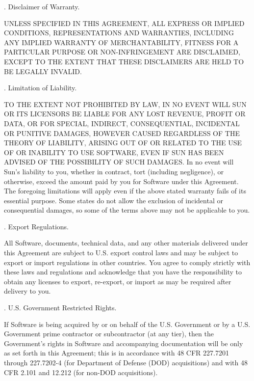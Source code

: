 \bigskip 
\par {}.      Disclaimer of Warranty. 
\bigskip 
\par \noindent UNLESS SPECIFIED IN THIS AGREEMENT, ALL EXPRESS OR IMPLIED CONDITIONS, REPRESENTATIONS AND WARRANTIES, INCLUDING ANY IMPLIED WARRANTY OF MERCHANTABILITY, FITNESS FOR A PARTICULAR PURPOSE OR NON-INFRINGEMENT ARE DISCLAIMED, EXCEPT TO THE EXTENT THAT THESE DISCLAIMERS ARE HELD TO BE LEGALLY INVALID. 
\bigskip 
\par {}.     Limitation of Liability. 
\bigskip 
\par \noindent TO THE EXTENT NOT PROHIBITED BY LAW, IN NO EVENT WILL SUN OR ITS LICENSORS BE LIABLE FOR ANY LOST REVENUE, PROFIT OR DATA, OR FOR SPECIAL, INDIRECT, CONSEQUENTIAL, INCIDENTAL OR PUNITIVE DAMAGES, HOWEVER CAUSED REGARDLESS OF THE THEORY OF LIABILITY, ARISING OUT OF OR RELATED TO THE USE OF OR INABILITY TO USE SOFTWARE, EVEN IF SUN HAS BEEN ADVISED OF THE POSSIBILITY OF SUCH DAMAGES. In no event will Sun's liability to you, whether in contract, tort (including negligence), or otherwise, exceed the amount paid by you for Software under this Agreement. The foregoing limitations will apply even if the above stated warranty fails of its essential purpose. Some states do not allow the exclusion of incidental or consequential damages, so some of the terms above may not be applicable to you. 
\bigskip 
\par {}.     Export Regulations. 
\bigskip 
\par \noindent All Software, documents, technical data, and any other materials delivered under this Agreement are subject to U.S. export control laws and may be subject to export or import regulations in other countries. You agree to comply strictly with these laws and regulations and acknowledge that you have the responsibility to obtain any licenses to export, re-export, or import as may be required after delivery to you. 
\bigskip 
\par {}.     U.S. Government Restricted Rights. 
\bigskip 
\par \noindent If Software is being acquired by or on behalf of the U.S. Government or by a U.S. Government prime contractor or subcontractor (at any tier), then the Government's rights in Software and accompanying documentation will be only as set forth in this Agreement; this is in accordance with 48 CFR 227.7201 through 227.7202-4 (for Department of Defense (DOD) acquisitions) and with 48 CFR 2.101 and 12.212 (for non-DOD acquisitions). 

